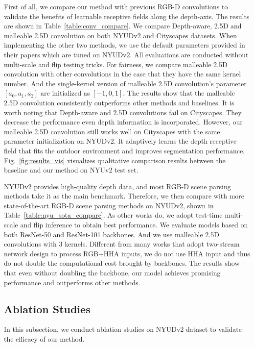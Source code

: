 \documentclass[runningheads]{llncs}
\begin{document}
First of all, we compare our method with previous RGB-D convolutions to validate the benefits of learnable receptive fields along the depth-axis.
The results are shown in Table~\ref{table:conv_compare}.
We compare Depth-aware, 2.5D and malleable 2.5D convolution on both NYUDv2 and Cityscapes datasets.
When implementing the other two methods, we use the default parameters provided in their papers\cite{DepthAware,2_5D} which are tuned on NYUDv2.
All evaluations are conducted without multi-scale and flip testing tricks.
For fairness, we compare malleable 2.5D convolution with other convolutions in the case that they have the same kernel number.
And the single-kernel version of malleable 2.5D convolution's parameter $[a_0, a_1, a_2]$ are initialized as $[-1,0,1]$.
The results show that the malleable 2.5D convolution consistently outperforms other methods and baselines.
It is worth noting that Depth-aware and 2.5D convolutions fail on Cityscapes.
They decrease the performance even depth information is incorporated.
However, our malleable 2.5D convolution still works well on Cityscapes with the same parameter initialization on NYUDv2.
It adaptively learns the depth receptive field that fits the outdoor environment and improves segmentation performance.
Fig.~\ref{fig:results_vis} visualizes qualitative comparison results between the baseline and our method on NYUv2 test set.

NYUDv2 provides high-quality depth data, and most RGB-D scene parsing methods take it as the main benchmark.
Therefore, we then compare with more state-of-the-art RGB-D scene parsing methods on NYUDv2, shown in Table~\ref{table:nyu_sota_compare}.
As other works do\cite{RDFNet,2_5D,Coupling}, we adopt test-time multi-scale and flip inference to obtain best performance.
We evaluate models based on both ResNet-50 and ResNet-101 backbones.
And we use malleable 2.5D convolutions with 3 kernels.
Different from many works that adopt two-stream network design to process RGB+HHA inputs, we do not use HHA input and thus do not double the computational cost brought by backbones.
The results show that even without doubling the backbone, our model achieves promising performance and outperforms other methods.

\subsection{Ablation Studies}
In this subsection, we conduct ablation studies on NYUDv2 dataset to validate the efficacy of our method.
\end{document}
